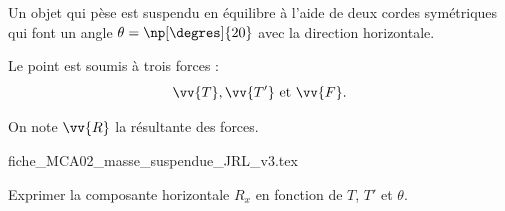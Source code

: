                                 \initialisationPartieGauche %
Un objet qui pèse  est suspendu en équilibre à l'aide de deux cordes symétriques qui font un angle $\theta=\np[\degres]{20}$ avec la direction horizontale. 

Le point \ptA est soumis à trois forces : 
\[
\vv{T}, \vv{T'}\text{ et }\vv{F}.
\] 

On note $\vv{R}$ la résultante des forces.
                                \initialisationPartieDroite %
\begin{center}
{fiche_MCA02_masse_suspendue_JRL_v3.tex}
\end{center}
                               \finalisationDuPartageDePage %



\debutEntrainement


\begin{enonce}
	 Exprimer la composante horizontale $R_x$ en fonction de $T$, $T'$ et $\theta$.
\end{enonce}


